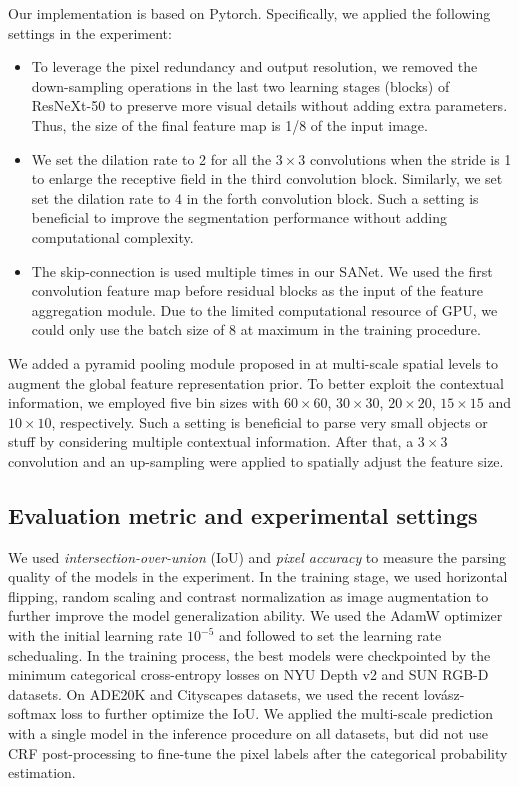 \documentclass[10pt,twocolumn,twoside]{IEEEtran}
\begin{document}
Our implementation is based on Pytorch. Specifically, we applied the following settings in the experiment: 
\begin{itemize}
    \item To leverage the pixel redundancy and output resolution, we removed the down-sampling operations in the last two learning stages (blocks) of ResNeXt-50 to preserve more visual details without adding extra parameters. Thus, the size of the final feature map is 1/8 of the input image.
    \item We set the dilation rate to 2 for all the $3\times3$ convolutions when the stride is 1 to enlarge the receptive field in the third convolution block. Similarly, we set set the dilation rate to 4 in the forth convolution block. Such a setting is beneficial to improve the segmentation performance without adding computational complexity.
    \item The skip-connection is used multiple times in our SANet. We used the first convolution feature map before residual blocks as the input of the feature aggregation module. Due to the limited computational resource of GPU, we could only use the batch size of 8 at maximum in the training procedure. \end{itemize}
We added a pyramid pooling module proposed in \cite{CVPR17:PSPNET} at multi-scale spatial levels to augment the global feature representation prior. To better exploit the contextual information, we employed five bin sizes with $60\times60$, $30\times30$, $20\times20$, $15\times15$ and $10\times10$, respectively. Such a setting is beneficial to parse very small objects or stuff by considering multiple contextual information. After that, a $3\times3$ convolution and an up-sampling were applied to spatially adjust the feature size. 


\subsection{Evaluation metric and experimental settings}

We used {\em intersection-over-union} (IoU) and {\em pixel accuracy} to measure the parsing quality of the models in the experiment. In the training stage, we used horizontal flipping, random scaling and contrast normalization as image augmentation to further improve the model generalization ability. We used the AdamW \cite{ICLR19:ADAMW} optimizer with the initial learning rate $10^{-5}$ and followed \cite{TPAMI:DEEPLAB} to set the learning rate schedualing. In the training process, the best models were checkpointed by the minimum categorical cross-entropy losses on NYU Depth v2 and SUN RGB-D datasets. On ADE20K and Cityscapes datasets, we used the recent lov{\'a}sz-softmax loss \cite{CVPR18:LOVAZ_LOSS} to further optimize the IoU. We applied the multi-scale prediction with a single model in the inference procedure on all datasets, but did not use CRF post-processing \cite{TPAMI:DEEPLAB} to fine-tune the pixel labels after the categorical probability estimation.
\end{document}
